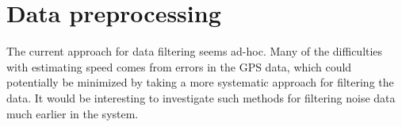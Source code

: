 


\section{Data preprocessing}
The current approach for data filtering seems ad-hoc. Many of the difficulties with estimating speed comes from errors in the GPS data, which could potentially be minimized by taking a more systematic approach for filtering the data. It would be interesting to investigate such methods for filtering noise data much earlier in the system.

